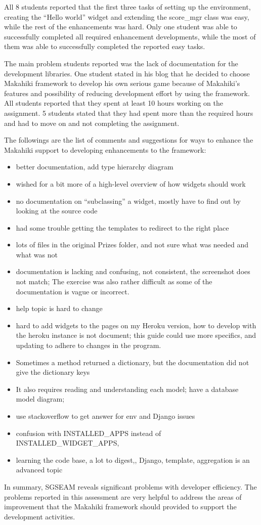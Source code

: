 All 8 students reported that the first three tasks of setting up the environment, creating the  ``Hello world'' widget and extending the score\_mgr class was easy, while the rest of the enhancements was hard. Only one student was able to successfully
completed all required enhancement developments, while the most of them was able to  successfully completed the reported easy tasks. 

The main problem students reported was the lack of documentation for the
development libraries. One student stated in his blog that he decided to choose Makahiki
framework to develop his own serious game because of Makahiki's features and possibility
of reducing development effort by using the framework. All students reported that they spent at least 10 hours working on the assignment. 5 students stated that they had spent more than the required hours and had to move on and not completing the assignment. 

The followings are the list of comments and suggestions for ways to enhance the Makahiki support to developing enhancements to the framework:
\begin{itemize}
\item better documentation, add type hierarchy diagram
\item wished for a bit more of a high-level overview of how widgets should work
\item no documentation on ``subclassing'' a widget, mostly have to find out by looking at the source code
\item had some trouble getting the templates to redirect to the right place
\item lots of files in the original Prizes folder, and not sure what was needed and what was not
\item documentation is lacking and confusing, not consistent, the screenshot does not match; The exercise was also rather difficult as some of the documentation is vague or incorrect.
\item help topic is hard to change
\item hard to add widgets to the pages on my Heroku version, how to develop with the heroku instance is not document;   this guide could use more specifics, and updating to adhere to changes in the program.
\item Sometimes a method returned a dictionary, but the documentation did not give the dictionary keys
\item It also requires reading and understanding each model; have a database model diagram;
\item use stackoverflow to get answer for env and Django issues
\item confusion with INSTALLED\_APPS instead of INSTALLED\_WIDGET\_APPS,
\item learning the code base, a lot to digest,, Django, template,  aggregation is an advanced topic
\end{itemize}

In summary, SGSEAM reveals significant problems with developer efficiency.
The problems reported in this assessment are very helpful to address the areas of improvement that the Makahiki framework should provided to support the development activities.
